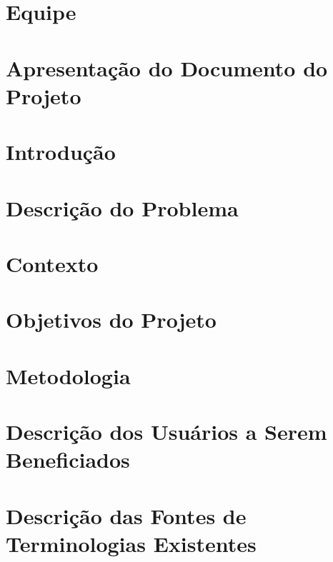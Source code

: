 \section{Equipe} %
\label{sec:introdu_o}
 

\section{Apresentação do Documento do Projeto} %
\label{sec:introdu_o}
 

\section{Introdução} %
\label{sec:introdu_o}
 

\section{Descrição do Problema} %
\label{sec:fundamentacao}
 

\section{Contexto} %
\label{sec:introdu_o}
 

\section{Objetivos do Projeto} %
\label{sec:introdu_o}
 

\section{Metodologia} %
\label{sec:metodologia}
 

\section{Descrição dos Usuários a Serem Beneficiados} %
\label{sec:introdu_o}
 

\section{Descrição das Fontes de Terminologias Existentes} %
\label{sec:equipe}
 

